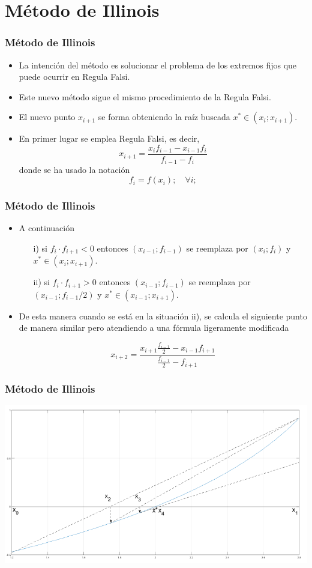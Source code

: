 \documentclass{beamer}
\begin{document}
\section{M\'etodo de Illinois}
\begin{frame}
  \frametitle{M\'etodo de Illinois}
  \begin{itemize}
    \item<1-> La intenci\'on del m\'etodo es solucionar el problema de los extremos fijos que puede
    ocurrir en Regula Falsi. 
    \item<2->Este nuevo m\'etodo sigue el mismo procedimiento
    de la Regula Falsi.
    \item<3-> El nuevo punto $x_{i+1}$ se forma obteniendo la ra\'iz
    buscada $x^* \in (x_i ;x_{i+1})$. 
    \item<4->En primer lugar se emplea Regula Falsi, es decir,
    $$
      x_{i+1} = \frac{x_if_{i-1}-x_{i-1}f_i}{f_{i-1}-f_i}
    $$  
    donde se ha usado la notaci\'on
    $$
      f_i = f(x_i);\quad \forall i;
    $$
  \end{itemize}
\end{frame}
\begin{frame}
  \frametitle{M\'etodo de Illinois}
  \begin{itemize}
    \item<1-> A continuación
    \begin{enumerate}
      \item[i)] si $f_i\cdot f_{i+1} < 0$ entonces $(x_{i-1}; f_{i-1})$ se reemplaza por $(x_i ; f_i )$ y $x^* \in (x_i ;x_{i+1})$.
      \item[ii)] si $f_i\cdot f_{i+1} > 0$ entonces $(x_{i-1}; f_{i-1})$ se reemplaza por $(x_{i-1}; f_{i-1}/2)$ y $x^* \in (x_{i-1};x_{i+1})$.
    \end{enumerate}
    \item<2-> De esta manera cuando se est\'a en la situación ii), se calcula el siguiente punto de manera similar pero atendiendo a una f\'ormula ligeramente
    modificada
    \begin{block}{}
    $$
      x_{i+2} = \frac{x_{i+1}\frac{f_{i-1}}{2}-x_{i-1}f_{i+1}}{\frac{f_{i-1}}{2}-f_{i+1}}
    $$  
    \end{block}    
  \end{itemize}    
\end{frame}
\begin{frame}
  \frametitle{M\'etodo de Illinois}
  \begin{center}
    \includegraphics[scale=0.5]{MetIllinois.png}
  \end{center}
\end{frame}
\end{document}
